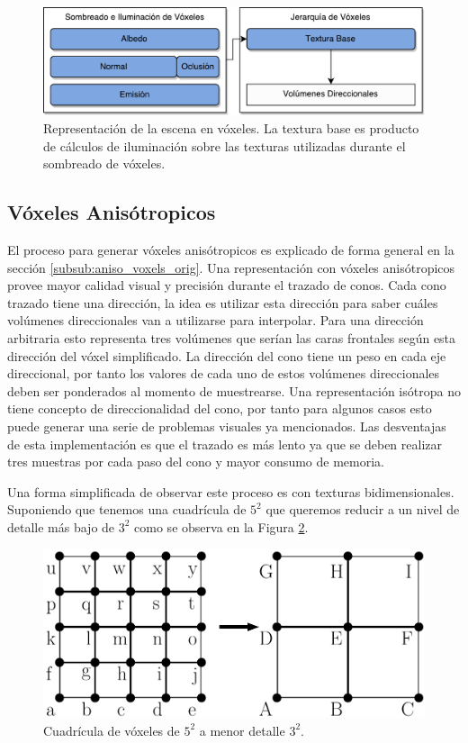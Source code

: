 \begin{figure}[H]
    \centering
    \includegraphics[width=.8\linewidth]{media/representation.pdf}
    \caption{Representación de la escena en vóxeles. La textura base es producto de cálculos de iluminación sobre las texturas utilizadas durante el sombreado de vóxeles.}
    \label{fig:base_texture_imp}
\end{figure}
\subsection{Vóxeles Anisótropicos} %
\label{sub:voxeles_anisotropos}
El proceso para generar vóxeles anisótropicos es explicado de forma general en la sección \ref{subsub:aniso_voxels_orig}. Una representación con vóxeles anisótropicos provee mayor calidad visual y precisión durante el trazado de conos. Cada cono trazado tiene una dirección, la idea es utilizar esta dirección para saber cuáles volúmenes direccionales van a utilizarse para interpolar. Para una dirección arbitraria esto representa tres volúmenes que serían las caras frontales según esta dirección del vóxel simplificado. La dirección del cono tiene un peso en cada eje direccional, por tanto los valores de cada uno de estos volúmenes direccionales deben ser ponderados al momento de muestrearse. Una representación isótropa no tiene concepto de direccionalidad del cono, por tanto para algunos casos esto puede generar una serie de problemas visuales ya mencionados. Las desventajas de esta implementación es que el trazado es más lento ya que se deben realizar tres muestras por cada paso del cono y mayor consumo de memoria.

Una forma simplificada de observar este proceso es con texturas bidimensionales. Suponiendo que tenemos una cuadrícula de $5^2$ que queremos reducir a un nivel de detalle más bajo de $3^2$ como se observa en la Figura \ref{fig:filter_objs}.

\begin{figure}[H]
    \centering
    \includegraphics[width=.5\linewidth]{media/filtering_1.pdf}
    \caption{Cuadrícula de vóxeles de $5^2$ a menor detalle $3^2$.}
   	\label{fig:filter_objs}
\end{figure}

